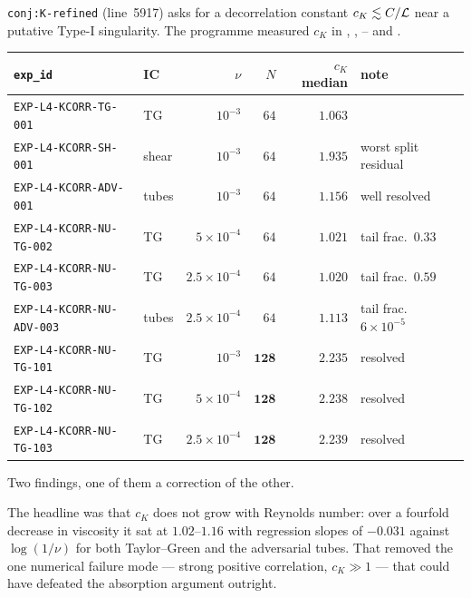 \texttt{conj:K-refined} (line~5917) asks for a decorrelation constant
\(c_K\lesssim C/\mathcal{L}\) near a putative Type-I singularity. The programme
measured \(c_K\) in , , -- and .

\begin{center}
\small
\begin{tabular}{@{}l l r r r l@{}}
\toprule
\texttt{exp\_id} & IC & \(\nu\) & \(N\) & \(c_K\) median & note \\
\midrule
\texttt{EXP-L4-KCORR-TG-001} & TG & \(10^{-3}\) & \(64\) & \(1.063\) & \\
\texttt{EXP-L4-KCORR-SH-001} & shear & \(10^{-3}\) & \(64\) & \(1.935\) & worst split residual \\
\texttt{EXP-L4-KCORR-ADV-001} & tubes & \(10^{-3}\) & \(64\) & \(1.156\) & well resolved \\
\texttt{EXP-L4-KCORR-NU-TG-002} & TG & \(5\!\times\!10^{-4}\) & \(64\) & \(1.021\) & tail frac.\ \(0.33\) \\
\texttt{EXP-L4-KCORR-NU-TG-003} & TG & \(2.5\!\times\!10^{-4}\) & \(64\) & \(1.020\) & tail frac.\ \(0.59\) \\
\texttt{EXP-L4-KCORR-NU-ADV-003} & tubes & \(2.5\!\times\!10^{-4}\) & \(64\) & \(1.113\) & tail frac.\ \(6\!\times\!10^{-5}\) \\
\texttt{EXP-L4-KCORR-NU-TG-101} & TG & \(10^{-3}\) & \(\mathbf{128}\) & \(\mathbf{2.235}\) & resolved \\
\texttt{EXP-L4-KCORR-NU-TG-102} & TG & \(5\!\times\!10^{-4}\) & \(\mathbf{128}\) & \(\mathbf{2.238}\) & resolved \\
\texttt{EXP-L4-KCORR-NU-TG-103} & TG & \(2.5\!\times\!10^{-4}\) & \(\mathbf{128}\) & \(\mathbf{2.239}\) & resolved \\
\bottomrule
\end{tabular}
\end{center}

\medskip
Two findings, one of them a correction of the other.

The  headline was that \(c_K\) does not grow with Reynolds number: over
a fourfold decrease in viscosity it sat at \(1.02\)--\(1.16\) with regression
slopes of \(-0.031\) against \(\log(1/\nu)\) for both Taylor--Green and the
adversarial tubes. That removed the one numerical failure mode --- strong
positive correlation, \(c_K\gg1\) --- that could have defeated the absorption
argument outright.


